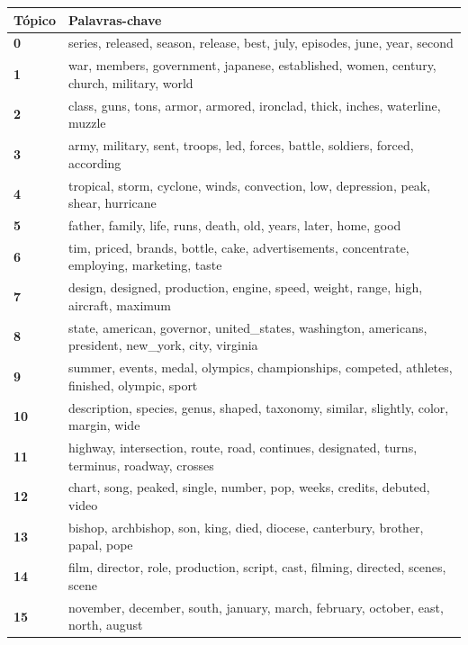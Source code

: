 \begin{table}[htpb]
    \centering
    \scriptsize
    \begin{tabularx}{\textwidth}{@{}l X@{}}
        \toprule
        \textbf{Tópico} & \textbf{Palavras-chave} \\
        \midrule
        \textbf{0} & series, released, season, release, best, july, episodes, june, year, second \\
        \textbf{1} & war, members, government, japanese, established, women, century, church, military, world \\
        \textbf{2} & class, guns, tons, armor, armored, ironclad, thick, inches, waterline, muzzle \\
        \textbf{3} & army, military, sent, troops, led, forces, battle, soldiers, forced, according \\
        \textbf{4} & tropical, storm, cyclone, winds, convection, low, depression, peak, shear, hurricane \\
        \textbf{5} & father, family, life, runs, death, old, years, later, home, good \\
        \textbf{6} & tim, priced, brands, bottle, cake, advertisements, concentrate, employing, marketing, taste \\
        \textbf{7} & design, designed, production, engine, speed, weight, range, high, aircraft, maximum \\
        \textbf{8} & state, american, governor, united\_states, washington, americans, president, new\_york, city, virginia \\
        \textbf{9} & summer, events, medal, olympics, championships, competed, athletes, finished, olympic, sport \\
        \textbf{10} & description, species, genus, shaped, taxonomy, similar, slightly, color, margin, wide \\
        \textbf{11} & highway, intersection, route, road, continues, designated, turns, terminus, roadway, crosses \\
        \textbf{12} & chart, song, peaked, single, number, pop, weeks, credits, debuted, video \\
        \textbf{13} & bishop, archbishop, son, king, died, diocese, canterbury, brother, papal, pope \\
        \textbf{14} & film, director, role, production, script, cast, filming, directed, scenes, scene \\
        \textbf{15} & november, december, south, january, march, february, october, east, north, august \\

\end{tabularx}
\end{table}
